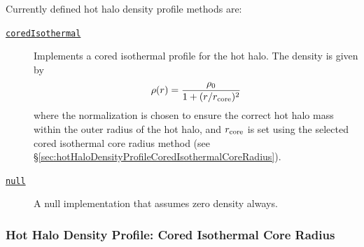 Currently defined hot halo density profile methods are:
\begin{description}
 \item [\hyperlink{hot_halo.density_profile.cored_isothermal.F90:hot_halo_density_profile_cored_isothermal:hot_halo_density_cored_isothermal_get}{{\tt coredIsothermal}}] Implements a cored isothermal profile for the hot halo. The density is given by
 \begin{equation}
  \rho(r) = {\rho_0 \over 1 + (r/r_{\rm core})^2}
 \end{equation}
 where the normalization is chosen to ensure the correct hot halo mass within the outer radius of the hot halo, and $r_{\rm core}$ is set using the selected cored isothermal core radius method (see \S\ref{sec:hotHaloDensityProfileCoredIsothermalCoreRadius}).
 \item [\hyperlink{hot_halo.density_profile.null.F90:hot_halo_density_profile_null:hot_halo_density_null_get}{{\tt null}}] A null implementation that assumes zero density always.
\end{description}

\subsubsection{Hot Halo Density Profile: Cored Isothermal Core Radius}

